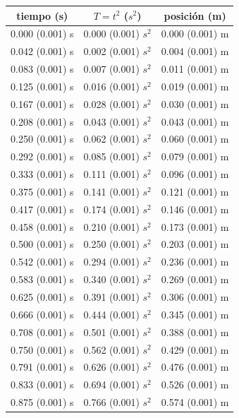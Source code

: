 \documentclass[12pt,a4paper]{article}
\begin{document}
\begin{table}[h!]
\begin{center}
\begin{tabular}{|c|c|c|}
\hline
tiempo (s) & $T = t^2$ ($s^2$) & posición (m) \\ \hline
0.000 (0.001) s & 0.000 (0.001) $s^2$ & 0.000 (0.001) m \\ \hline
0.042 (0.001) s & 0.002 (0.001) $s^2$ & 0.004 (0.001) m \\ \hline
0.083 (0.001) s & 0.007 (0.001) $s^2$ & 0.011 (0.001) m \\ \hline
0.125 (0.001) s & 0.016 (0.001) $s^2$ & 0.019 (0.001) m \\ \hline
0.167 (0.001) s & 0.028 (0.001) $s^2$ & 0.030 (0.001) m \\ \hline
0.208 (0.001) s & 0.043 (0.001) $s^2$ & 0.043 (0.001) m \\ \hline
0.250 (0.001) s & 0.062 (0.001) $s^2$ & 0.060 (0.001) m \\ \hline
0.292 (0.001) s & 0.085 (0.001) $s^2$ & 0.079 (0.001) m \\ \hline
0.333 (0.001) s & 0.111 (0.001) $s^2$ & 0.096 (0.001) m \\ \hline
0.375 (0.001) s & 0.141 (0.001) $s^2$ & 0.121 (0.001) m \\ \hline
0.417 (0.001) s & 0.174 (0.001) $s^2$ & 0.146 (0.001) m \\ \hline
0.458 (0.001) s & 0.210 (0.001) $s^2$ & 0.173 (0.001) m \\ \hline
0.500 (0.001) s & 0.250 (0.001) $s^2$ & 0.203 (0.001) m \\ \hline
0.542 (0.001) s & 0.294 (0.001) $s^2$ & 0.236 (0.001) m \\ \hline
0.583 (0.001) s & 0.340 (0.001) $s^2$ & 0.269 (0.001) m \\ \hline
0.625 (0.001) s & 0.391 (0.001) $s^2$ & 0.306 (0.001) m \\ \hline
0.666 (0.001) s & 0.444 (0.001) $s^2$ & 0.345 (0.001) m \\ \hline
0.708 (0.001) s & 0.501 (0.001) $s^2$ & 0.388 (0.001) m \\ \hline
0.750 (0.001) s & 0.562 (0.001) $s^2$ & 0.429 (0.001) m \\ \hline
0.791 (0.001) s & 0.626 (0.001) $s^2$ & 0.476 (0.001) m \\ \hline
0.833 (0.001) s & 0.694 (0.001) $s^2$ & 0.526 (0.001) m \\ \hline
0.875 (0.001) s & 0.766 (0.001) $s^2$ & 0.574 (0.001) m \\ \hline

\end{tabular}
\end{center}
\end{table}
\end{document}
